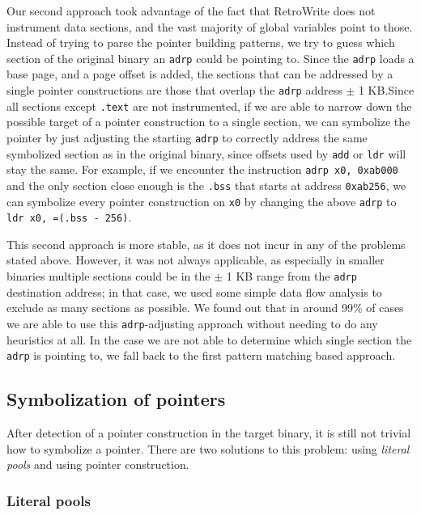 \documentclass[a4paper,11pt,oneside]{report}
\newcommand{\sysname}{RetroWrite\xspace}
\begin{document}
Our second approach took advantage of the fact that \sysname does not 
instrument data sections, and the vast majority of global variables point to
those. Instead of trying to parse the pointer building patterns, we try to
guess which section of the original binary an \texttt{adrp} could be pointing
to. Since the \texttt{adrp} loads a base page, and a page offset is added, the
sections that can be addressed by a single pointer constructions are those that
overlap the \texttt{adrp} address $\pm$ 1 KB.\@ Since all sections except
\texttt{.text} are not instrumented, if we are able to narrow down the possible
target of a pointer construction to a single section, we can symbolize the
pointer by just adjusting the starting 
\texttt{adrp} to correctly address the same symbolized section as in the 
original binary, since offsets used by \texttt{add} or \texttt{ldr} will stay 
the same.
For example, if we encounter the instruction \texttt{adrp x0, 0xab000} and the
only section close enough is the \texttt{.bss} that starts at address
\texttt{0xab256}, we can symbolize every pointer construction on \texttt{x0} by
changing the above \texttt{adrp} to \texttt{ldr x0, =(.bss - 256)}.



This second approach is more stable, as it does not
incur in any of the problems stated above. However, it was not always
applicable, as especially in smaller binaries multiple sections could be in the
$\pm$ 1 KB range from the \texttt{adrp} destination address; in that case, we
used some simple data flow analysis to exclude as many sections as possible.
We found out that in around 99\% of cases we are able to use this \texttt{adrp}-adjusting
approach without needing to do any heuristics at all. In the case we are not able
to determine which single section the \texttt{adrp} is pointing to, we fall back
to the first pattern matching based approach. 


\subsection{Symbolization of pointers}

After detection of a pointer construction in the target binary, it is still not 
trivial how to symbolize a pointer. There are two solutions to this problem: 
using \emph{literal pools} and using pointer construction.

\subsubsection{Literal pools}
\end{document}
